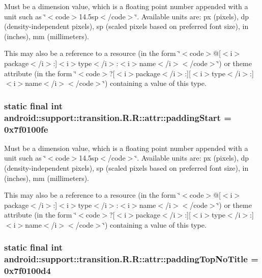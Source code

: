 Must be a dimension value, which is a floating point number appended with a unit such as \char`\"{}$<$code$>$14.5sp$<$/code$>$\char`\"{}. Available units are: px (pixels), dp (density-independent pixels), sp (scaled pixels based on preferred font size), in (inches), mm (millimeters). 

This may also be a reference to a resource (in the form \char`\"{}$<$code$>$@\mbox{[}$<$i$>$package$<$/i$>$:\mbox{]}$<$i$>$type$<$/i$>$:$<$i$>$name$<$/i$>$$<$/code$>$\char`\"{}) or theme attribute (in the form \char`\"{}$<$code$>$?\mbox{[}$<$i$>$package$<$/i$>$:\mbox{]}\mbox{[}$<$i$>$type$<$/i$>$:\mbox{]}$<$i$>$name$<$/i$>$$<$/code$>$\char`\"{}) containing a value of this type. \hypertarget{classandroid_1_1support_1_1transition_1_1_r_1_1attr_83cda8715dbd94f13979f8abfd88214d}{
\subsubsection[{paddingStart}]{\setlength{\rightskip}{0pt plus 5cm}static final int android::support::transition.R.R::attr::paddingStart = 0x7f0100fe}}
\label{classandroid_1_1support_1_1transition_1_1_r_1_1attr_83cda8715dbd94f13979f8abfd88214d}


Must be a dimension value, which is a floating point number appended with a unit such as \char`\"{}$<$code$>$14.5sp$<$/code$>$\char`\"{}. Available units are: px (pixels), dp (density-independent pixels), sp (scaled pixels based on preferred font size), in (inches), mm (millimeters). 

This may also be a reference to a resource (in the form \char`\"{}$<$code$>$@\mbox{[}$<$i$>$package$<$/i$>$:\mbox{]}$<$i$>$type$<$/i$>$:$<$i$>$name$<$/i$>$$<$/code$>$\char`\"{}) or theme attribute (in the form \char`\"{}$<$code$>$?\mbox{[}$<$i$>$package$<$/i$>$:\mbox{]}\mbox{[}$<$i$>$type$<$/i$>$:\mbox{]}$<$i$>$name$<$/i$>$$<$/code$>$\char`\"{}) containing a value of this type. \hypertarget{classandroid_1_1support_1_1transition_1_1_r_1_1attr_96edbed8c288aa3aace043382d0fe3a4}{
\subsubsection[{paddingTopNoTitle}]{\setlength{\rightskip}{0pt plus 5cm}static final int android::support::transition.R.R::attr::paddingTopNoTitle = 0x7f0100d4}}
\label{classandroid_1_1support_1_1transition_1_1_r_1_1attr_96edbed8c288aa3aace043382d0fe3a4}


